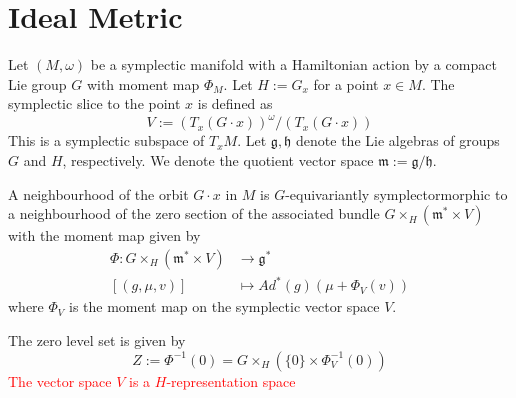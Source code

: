 \documentclass[a4paper,12pt]{article}
\newcommand{\tgt}[2]{T_{#1} #2}
\newcommand{\inv}[1]{#1^{-1}}
\newcommand{\red}[1]{\textcolor{red}{#1}}
\begin{document}
	\section{Ideal Metric}
	Let $(M,\omega)$ be a symplectic manifold with a Hamiltonian action by a compact Lie group $G$ with moment map $\Phi_M$. Let $H:=G_x$ for a point $x\in M$. The symplectic slice to the point $x$ is defined as 
	\begin{equation}
		V:= (\tgt{x}{(G\cdot x)})^\omega / (\tgt{x}{(G\cdot x)})
	\end{equation}
	This is a symplectic subspace of $\tgt{x}{M}$. Let $\mathfrak{g},\mathfrak{h}$ denote the Lie algebras of groups $G$ and $H$, respectively. We denote the quotient vector space $\mathfrak{m}:= \mathfrak{g}/\mathfrak{h}$.
	
	\begin{theorem}[Prop 2.5, SL]
		A neighbourhood of the orbit $G\cdot x$ in $M$ is $G$-equivariantly symplectormorphic to a neighbourhood of the zero section of the associated bundle $G \times_H (\mathfrak{m}^* \times V)$ with the moment map given by 
		\begin{equation}
			\begin{split}
				\Phi : G \times_H (\mathfrak{m}^* \times V) &\rightarrow \mathfrak{g}^* \\
				[(g,\mu,v)] & \mapsto {Ad}^*(g) (\mu + \Phi_V(v))
			\end{split}
		\end{equation}
	where $\Phi_V$ is the moment map on the symplectic vector space $V$. 
	\end{theorem}  
	The zero level set is given by
	\begin{equation}
		Z:= \inv{\Phi}(0) = G \times_H(\{0\}\times \inv{\Phi_V}(0))
	\end{equation}
	\red{The vector space $V$ is a $H$-representation space }
\end{document}

